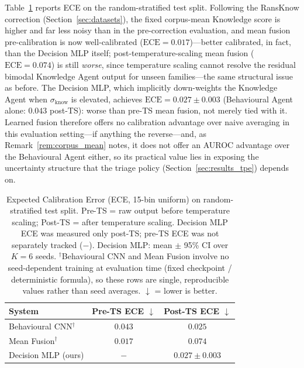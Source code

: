 \documentclass[journal]{IEEEtran}
\begin{document}
Table~\ref{tab:calibration} reports ECE on the random-stratified test
split. Following the RansKnow correction (Section~\ref{sec:datasets}), the
fixed corpus-mean Knowledge score is higher and far less noisy than in the
pre-correction evaluation, and mean fusion pre-calibration is now
well-calibrated ($\text{ECE}{=}0.017$)---better calibrated, in fact, than
the Decision MLP itself; post-temperature-scaling mean fusion
($\text{ECE}{=}0.074$) is still \emph{worse}, since temperature scaling
cannot resolve the residual bimodal Knowledge Agent output for unseen
families---the same structural issue as before. The Decision MLP, which
implicitly down-weights the Knowledge Agent when $\sigma_{\text{know}}$ is
elevated, achieves $\text{ECE}{=}0.027 \pm 0.003$ (Behavioural Agent
alone: $0.043$ post-TS): worse than pre-TS mean fusion, not merely tied
with it. Learned fusion therefore offers no calibration advantage over
naive averaging in this evaluation setting---if anything the
reverse---and, as Remark~\ref{rem:corpus_mean} notes, it does not offer an
AUROC advantage over the Behavioural Agent either, so its practical value
lies in exposing the uncertainty structure that the triage policy
(Section~\ref{sec:results_tpe}) depends on.

\begin{table}[t]
\centering
\footnotesize
\caption{Expected Calibration Error (ECE, 15-bin uniform) on random-stratified
  test split. Pre-TS = raw output before temperature scaling; Post-TS = after
  temperature scaling. Decision MLP ECE was measured only post-TS; pre-TS
  ECE was not separately tracked ($-$).
  Decision MLP: mean $\pm$ 95\% CI over $K{=}6$ seeds. ${}^\dagger$Behavioural
  CNN and Mean Fusion involve no seed-dependent training at evaluation time
  (fixed checkpoint / deterministic formula), so these rows are single,
  reproducible values rather than seed averages.
  $\downarrow$ = lower is better.
}
\label{tab:calibration}
\setlength{\tabcolsep}{5pt}
\begin{tabular}{lcc}
\toprule
System & Pre-TS ECE $\downarrow$ & Post-TS ECE $\downarrow$ \\
\midrule
Behavioural CNN${}^\dagger$     & $0.043$ & $0.025$ \\
Mean Fusion${}^\dagger$         & $\mathbf{0.017}$ & $0.074$ \\
Decision MLP (ours) & $-$     & $0.027 \pm 0.003$ \\
\bottomrule
\end{tabular}
\end{table}
\end{document}
